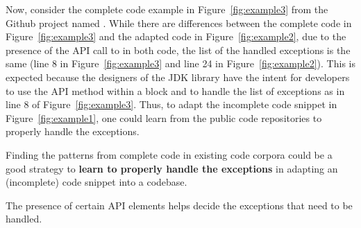 





Now, consider the complete code example in Figure~\ref{fig:example3}
from the Github project named . While there are
differences between the complete code in Figure~\ref{fig:example3} and
the adapted code in Figure~\ref{fig:example2}, due to the presence of
the API call to  in both code, the list of
the handled exceptions is the same (line 8 in
Figure~\ref{fig:example3} and line 24 in
Figure~\ref{fig:example2}). This is expected because the designers of
the JDK library have the intent for developers to use the API method
 within a  block and to
handle the list of exceptions as in line 8 of
Figure~\ref{fig:example3}. Thus, to adapt the incomplete code snippet
in Figure~\ref{fig:example1}, one could learn from the public code
repositories to properly handle the exceptions.

\begin{Observation} 
\label{ob2}
Finding the patterns from complete code in existing code corpora could
be a good strategy to {\bf learn to properly handle the exceptions} in
adapting an (incomplete) code snippet into a codebase.
\end{Observation}


\begin{Observation} 
\label{ob3}
The presence of certain API elements helps decide the exceptions that
need to be handled.
\end{Observation}

